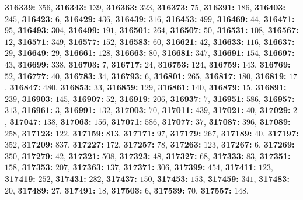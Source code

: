 \textsf{\bfseries 316339:} $356$, \textsf{\bfseries 316343:} $139$, \textsf{\bfseries 316363:} $323$, \textsf{\bfseries 316373:} $75$, \textsf{\bfseries 316391:} $186$, \textsf{\bfseries 316403:} $245$, \textsf{\bfseries 316423:} $6$, \textsf{\bfseries 316429:} $436$, \textsf{\bfseries 316439:} $316$, \textsf{\bfseries 316453:} $499$, \textsf{\bfseries 316469:} $44$, \textsf{\bfseries 316471:} $95$, \textsf{\bfseries 316493:} $304$, \textsf{\bfseries 316499:} $191$, \textsf{\bfseries 316501:} $264$, \textsf{\bfseries 316507:} $50$, \textsf{\bfseries 316531:} $108$, \textsf{\bfseries 316567:} $12$, \textsf{\bfseries 316571:} $349$, \textsf{\bfseries 316577:} $152$, \textsf{\bfseries 316583:} $60$, \textsf{\bfseries 316621:} $42$, \textsf{\bfseries 316633:} $116$, \textsf{\bfseries 316637:} $29$, \textsf{\bfseries 316649:} $29$, \textsf{\bfseries 316661:} $128$, \textsf{\bfseries 316663:} $80$, \textsf{\bfseries 316681:} $347$, \textsf{\bfseries 316691:} $154$, \textsf{\bfseries 316697:} $43$, \textsf{\bfseries 316699:} $338$, \textsf{\bfseries 316703:} $7$, \textsf{\bfseries 316717:} $24$, \textsf{\bfseries 316753:} $124$, \textsf{\bfseries 316759:} $143$, \textsf{\bfseries 316769:} $52$, \textsf{\bfseries 316777:} $40$, \textsf{\bfseries 316783:} $34$, \textsf{\bfseries 316793:} $6$, \textsf{\bfseries 316801:} $265$, \textsf{\bfseries 316817:} $180$, \textsf{\bfseries 316819:} $17$, \textsf{\bfseries 316847:} $480$, \textsf{\bfseries 316853:} $33$, \textsf{\bfseries 316859:} $129$, \textsf{\bfseries 316861:} $140$, \textsf{\bfseries 316879:} $15$, \textsf{\bfseries 316891:} $239$, \textsf{\bfseries 316903:} $145$, \textsf{\bfseries 316907:} $52$, \textsf{\bfseries 316919:} $206$, \textsf{\bfseries 316937:} $7$, \textsf{\bfseries 316951:} $586$, \textsf{\bfseries 316957:} $313$, \textsf{\bfseries 316961:} $3$, \textsf{\bfseries 316991:} $132$, \textsf{\bfseries 317003:} $70$, \textsf{\bfseries 317011:} $439$, \textsf{\bfseries 317021:} $40$, \textsf{\bfseries 317029:} $2$, \textsf{\bfseries 317047:} $138$, \textsf{\bfseries 317063:} $156$, \textsf{\bfseries 317071:} $586$, \textsf{\bfseries 317077:} $37$, \textsf{\bfseries 317087:} $396$, \textsf{\bfseries 317089:} $258$, \textsf{\bfseries 317123:} $122$, \textsf{\bfseries 317159:} $813$, \textsf{\bfseries 317171:} $97$, \textsf{\bfseries 317179:} $267$, \textsf{\bfseries 317189:} $40$, \textsf{\bfseries 317197:} $352$, \textsf{\bfseries 317209:} $837$, \textsf{\bfseries 317227:} $172$, \textsf{\bfseries 317257:} $78$, \textsf{\bfseries 317263:} $123$, \textsf{\bfseries 317267:} $6$, \textsf{\bfseries 317269:} $350$, \textsf{\bfseries 317279:} $42$, \textsf{\bfseries 317321:} $508$, \textsf{\bfseries 317323:} $48$, \textsf{\bfseries 317327:} $68$, \textsf{\bfseries 317333:} $83$, \textsf{\bfseries 317351:} $158$, \textsf{\bfseries 317353:} $207$, \textsf{\bfseries 317363:} $137$, \textsf{\bfseries 317371:} $306$, \textsf{\bfseries 317399:} $454$, \textsf{\bfseries 317411:} $123$, \textsf{\bfseries 317419:} $252$, \textsf{\bfseries 317431:} $282$, \textsf{\bfseries 317437:} $150$, \textsf{\bfseries 317453:} $153$, \textsf{\bfseries 317459:} $341$, \textsf{\bfseries 317483:} $20$, \textsf{\bfseries 317489:} $27$, \textsf{\bfseries 317491:} $18$, \textsf{\bfseries 317503:} $6$, \textsf{\bfseries 317539:} $70$, \textsf{\bfseries 317557:} $148$, 
